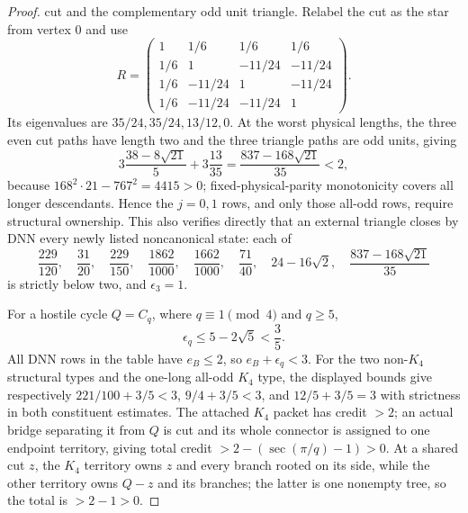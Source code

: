 \documentclass[11pt]{article}
\theoremstyle{remark}
\begin{document}
\begin{proof}
cut and the complementary odd unit triangle.  Relabel the cut as the star
from vertex $0$ and use
\[
 R=\begin{pmatrix}
 1&1/6&1/6&1/6\\
 1/6&1&-11/24&-11/24\\
 1/6&-11/24&1&-11/24\\
 1/6&-11/24&-11/24&1
 \end{pmatrix}.
\]
Its eigenvalues are $35/24,35/24,13/12,0$.  At the worst physical
lengths, the three even cut paths have length two and the three triangle
paths are odd units, giving
\[
 3\frac{38-8\sqrt{21}}5+3\frac{13}{35}
 =\frac{837-168\sqrt{21}}{35}<2,
\]
because $168^2\cdot21-767^2=4415>0$; fixed-physical-parity monotonicity
covers all longer descendants.  Hence the $j=0,1$ rows, and only those
all-odd rows, require structural ownership.  This also verifies directly that
an external triangle closes by DNN every newly listed noncanonical state:
each of
\[
 \frac{229}{120},\quad\frac{31}{20},\quad\frac{229}{150},
 \quad\frac{1862}{1000},\quad\frac{1662}{1000},\quad\frac{71}{40},\quad
 24-16\sqrt2,\quad\frac{837-168\sqrt{21}}{35}
\]
is strictly below two, and $\epsilon_3=1$.

For a hostile cycle $Q=C_q$, where $q\equiv1\pmod4$ and $q\geq5$,
\[
 \epsilon_q\leq5-2\sqrt5<\frac35.
\]
All DNN rows in the table have $e_B\leq2$, so $e_B+\epsilon_q<3$.
For the two non-$K_4$ structural types and the one-long all-odd $K_4$ type,
the displayed bounds give respectively
$221/100+3/5<3$, $9/4+3/5<3$, and $12/5+3/5=3$ with strictness in both
constituent estimates.  The attached $K_4$ packet has credit $>2$; an actual
bridge separating it from $Q$ is cut and its whole connector is assigned to
one endpoint territory, giving total credit
$>2-(\sec(\pi/q)-1)>0$.  At a shared cut $z$, the $K_4$ territory owns $z$
and every branch rooted on its side, while the other territory owns $Q-z$ and
its branches; the latter is one nonempty tree, so the total is $>2-1>0$.


\end{proof}
\end{document}

